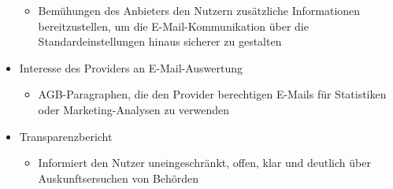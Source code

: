 \documentclass  [paper=a4,
				fontsize=12pt,
				listof=totoc,
				bibliography=totoc
				]{scrreprt}
\begin{document}
\begin{smaller}
\begin{itemize}
				\begin{itemize}
					\item Bemühungen des Anbieters den Nutzern zusätzliche Informationen bereitzustellen, um die E-Mail-Kommunikation über die Standardeinstellungen hinaus sicherer zu gestalten
				\end{itemize}			
				\item Interesse des Providers an E-Mail-Auswertung
				\begin{itemize}
					\item AGB-Paragraphen, die den Provider berechtigen E-Mails für Statistiken oder Marketing-Analysen zu verwenden
				\end{itemize}				
				\item Transparenzbericht
				\begin{itemize}
					\item Informiert den Nutzer uneingeschränkt, offen, klar und deutlich über Auskunftsersuchen von Behörden
				\end{itemize}
			\end{itemize} 
			\end{smaller} 					
\end{document}
